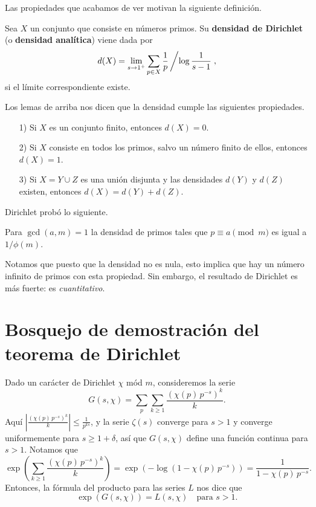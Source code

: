 \vspace{1em}

Las propiedades que acabamos de ver motivan la siguiente definición.

\begin{definicion}
  Sea $X$ un conjunto que consiste en números primos.
  Su \textbf{densidad de Dirichlet} (o \textbf{densidad analítica})
  viene dada por
  $$d (X) = \lim_{s \to 1^+} \sum_{p \in X} \frac{1}{p}\left/\log \frac{1}{s-1}\right.,$$
  si el límite correspondiente existe.
\end{definicion}

Los lemas de arriba nos dicen que la densidad cumple las siguientes propiedades.

\begin{enumerate}
\item[1)] Si $X$ es un conjunto finito, entonces $d (X) = 0$.

\item[2)] Si $X$ consiste en todos los primos, salvo un número finito de ellos,
  entonces $d (X) = 1$.

\item[3)] Si $X = Y \cup Z$ es una unión disjunta y las densidades $d (Y)$ y
  $d (Z)$ existen, entonces $d (X) = d (Y) + d (Z)$.
\end{enumerate}

Dirichlet probó lo siguiente.

\begin{teorema}
  Para $\gcd (a,m) = 1$ la densidad de primos tales que $p \equiv a \pmod{m}$
  es igual a $1/\phi(m)$.
\end{teorema}

Notamos que puesto que la densidad no es nula, esto implica que hay un número
infinito de primos con esta propiedad. Sin embargo, el resultado de Dirichlet
es más fuerte: es \emph{cuantitativo}.


\section{Bosquejo de demostración del teorema de Dirichlet}

Dado un carácter de Dirichlet $\chi$ mód $m$, consideremos la serie
$$G (s,\chi) = \sum_p \sum_{k\ge 1} \frac{(\chi (p)\,p^{-s})^k}{k}.$$
Aquí $\left|\frac{(\chi (p)\,p^{-s})^k}{k}\right| \le \frac{1}{p^{ks}}$,
y la serie $\zeta (s)$ converge para $s > 1$ y converge uniformemente para
$s \ge 1 + \delta$, así que $G (s,\chi)$ define una función continua para
$s > 1$. Notamos que
\[ \exp \left(\sum_{k\ge 1} \frac{(\chi (p)\,p^{-s})^k}{k}\right) =
\exp (-\log (1 - \chi (p)\,p^{-s})) = \frac{1}{1 - \chi(p)\,p^{-s}}. \]
Entonces, la fórmula del producto para las series $L$ nos dice que
$$\exp (G (s,\chi)) = L (s,\chi) \quad\text{para }s > 1.$$

